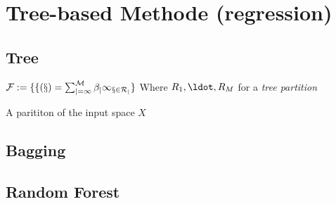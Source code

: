 \documentclass[11pt]{article}
\author{bachir el khadir}
\date{\today}
\title{}
\begin{document}
\tableofcontents

\section{Tree-based Methode (regression)}
\label{sec:orgheadline4}
\subsection{Tree}
\label{sec:orgheadline1}


\begin{theorem}
$\cal F := \{ f(x) = \sum_{j=1}^M \beta_j 1_{x \in R_j} \}$  Where \(R_1, \ldot, R_M\) for a \textit{tree partition}
\label{orgspecialblock1}

\end{theorem}


\begin{theorem}
A parititon of the input space \(X\) 
\label{orgspecialblock2}

\end{theorem}

\subsection{Bagging}
\label{sec:orgheadline2}
\subsection{Random Forest}
\label{sec:orgheadline3}
\end{document}
